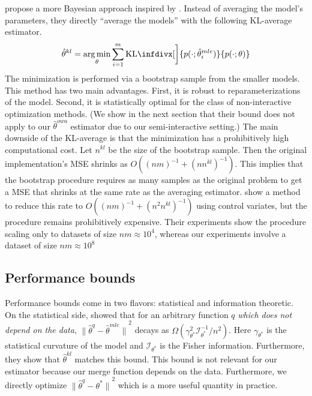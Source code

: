 \documentclass[twoside]{article}
\DeclareMathOperator*{\argmin}{arg\,min}
\newcommand{\w}{\theta}
\newcommand{\wkl}{\hat\w^{kl}}
\newcommand{\wowa}{\hat\w^{owa}}
\newcommand{\wave}{\hat\w^{ave}}
\newcommand{\wmle}{\hat\w^{mle}}
\newcommand{\wstar}{{\w^{*}}}
\newcommand{\wq}{\hat\w^{q}}
\newcommand{\I}{\mathcal I}
\newcommand{\ltwo}[1]{{\lVert {#1} \rVert}}
\newcommand{\kl}{\text{KL}\infdivx}
\begin{document}

\cite{liu2014distributed} propose a more Bayesian approach inspired by \cite{merugu2003privacy}.
Instead of averaging the model's parameters,
they directly ``average the models'' with the following KL-average estimator.
\begin{equation}
\wkl = \argmin_\w \sum_{i=1}^m \kl[\bigg]{p(\cdot;\wmle_i)}{p(\cdot;\w)}
\end{equation}
The minimization is performed via a bootstrap sample from the smaller models.
This method has two main advantages.
First, it is robust to reparameterizations of the model.
Second, it is statistically optimal for the class of non-interactive optimization methods.
(We show in the next section that their bound does not apply to our $\wowa$ estimator due to our semi-interactive setting.)
The main downside of the KL-average is that the minimization has a prohibitively high computational cost.
Let $n^{kl}$ be the size of the bootstrap sample.
Then the original implementation's MSE shrinks as $O((nm)^{-1}+(nn^{kl})^{-1})$.
This implies that the bootstrap procedure requires as many samples as the original problem to get a MSE that shrinks at the same rate as the averaging estimator.
\cite{han2016bootstrap} show a method to reduce this rate to $O((nm)^{-1}+(n^2n^{kl})^{-1})$ using control variates, but the procedure remains prohibitively expensive.
Their experiments show the procedure scaling only to datasets of size $nm\approx10^4$,
whereas our experiments involve a dataset of size $nm\approx10^8$

\subsection{Performance bounds}
\label{sec:bounds}

Performance bounds come in two flavors: statistical and information theoretic.
On the statistical side, \cite{liu2014distributed} showed that for an arbitrary function $q$ \emph{which does not depend on the data},
$\ltwo{\wq-\wmle}^2$ decays as $\Omega(\gamma^2_\wstar \I^{-1}_\wstar/n^2)$.
Here $\gamma_\wstar$ is the statistical curvature of the model and $\I_\wstar$ is the Fisher information.
Furthermore, they show that $\wkl$ matches this bound.
This bound is not relevant for our estimator because our merge function depends on the data.
Furthermore, we directly optimize $\ltwo{\wq-\wstar}^2$ which is a more useful quantity in practice.
\end{document}
